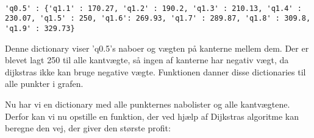 \begin{lstlisting}

'q0.5' : {'q1.1' : 170.27, 'q1.2' : 190.2, 'q1.3' : 210.13, 'q1.4' : 230.07, 'q1.5' : 250, 'q1.6': 269.93, 'q1.7' : 289.87, 'q1.8' : 309.8, 'q1.9' : 329.73}

\end{lstlisting}
Denne dictionary viser 'q0.5's naboer og vægten på kanterne mellem dem. Der er blevet lagt 250 til alle kantvægte, så ingen af kanterne har negativ vægt, da dijkstras ikke kan bruge negative vægte.
Funktionen danner disse dictionaries til alle punkter i grafen.


Nu har vi en dictionary med alle punkternes nabolister og alle kantvægtene. Derfor kan vi nu opstille en funktion, der ved hjælp af Dijkstras algoritme kan beregne den vej, der giver den største profit:



